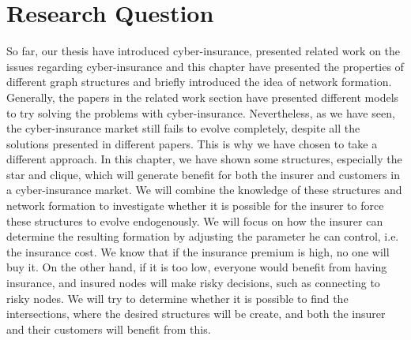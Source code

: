 \section{Research Question}
So far, our thesis have introduced cyber-insurance, presented related work on the issues regarding cyber-insurance and this chapter have presented the properties of different graph structures and briefly introduced the idea of network formation. Generally, the papers in the related work section have presented different models to try solving the problems with cyber-insurance. Nevertheless, as we have seen, the cyber-insurance market still fails to evolve completely, despite all the solutions presented in different papers. This is why we have chosen to take a different approach.
In this chapter, we have shown some structures, especially the star and clique, which will generate benefit for both the insurer and customers in a cyber-insurance market. We will combine the knowledge of these structures and network formation to investigate whether it is possible for the insurer to force these structures to evolve endogenously. We will focus on how the insurer can determine the resulting formation by adjusting the parameter he can control, i.e. the insurance cost. We know that if the insurance premium is high, no one will buy it. On the other hand, if it is too low, everyone would benefit from having insurance, and insured nodes will make risky decisions, such as connecting to risky nodes. We will try to determine whether it is possible to find the intersections, where the desired structures will be create, and both the insurer and their customers will benefit from this.

